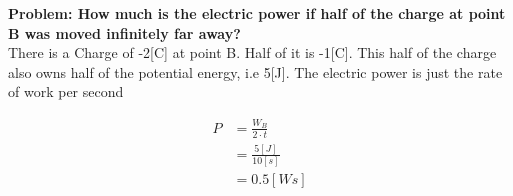\documentclass[paper=a4, fontsize=11pt]{scrartcl} %
\numberwithin{equation}{section} %
\numberwithin{figure}{section} %
\numberwithin{table}{section} %
\begin{document}
\textbf{Problem: How much is the electric power if half of the charge at point B was 
moved infinitely far away?} \\

There is a Charge of -2[C] at point B. Half of it is -1[C]. This half of the charge also owns
half of the potential energy, i.e 5[J]. The electric power is just the rate of work per second

\begin{align} \label{eq:8}
P &= \frac{W_B}{2 \cdot t} \\
  &= \frac{5[J]}{10[s]} \\
  &=  0.5 [Ws]
\end{align}
\end{document}

